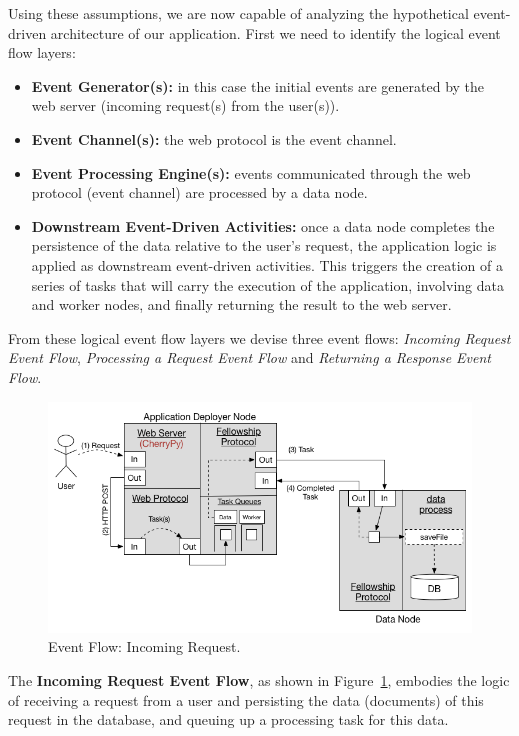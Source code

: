 \documentclass[12pt, titlepage]{uo_temp}
\begin{document}
     Using these assumptions, we are now capable of analyzing the hypothetical event-driven
     architecture of our application. 
     First we need to identify the logical event flow layers:
     \begin{itemize}
     \item \textbf{Event Generator(s):} in this case the initial events are generated by
       the web server (incoming request(s) from the user(s)).
     \item \textbf{Event Channel(s):} the web protocol is the event channel.
     \item \textbf{Event Processing Engine(s):} events communicated through the web
       protocol (event channel) are processed by a data node.
     \item \textbf{Downstream Event-Driven Activities:} once a data node completes the
       persistence of the data relative to the user's request, the application logic is
       applied as downstream event-driven activities. This triggers the creation of
       a series of tasks that will carry the execution of the application, involving data
       and worker nodes, and finally returning the result to the web server.
     \end{itemize}
     From these logical event flow layers we devise three event flows: \emph{Incoming
       Request Event Flow}, \emph{Processing a Request Event Flow} and \emph{Returning a
       Response Event Flow}.
     
     \begin{figure}[h!]
       \centering
       \includegraphics[width=125mm]{images/ef1.png}
       \caption{Event Flow: Incoming Request.}
       \label{ef1}
     \end{figure}

     The \textbf{Incoming Request Event Flow}, as shown in Figure~\ref{ef1}, embodies the
     logic of receiving a request from a user and persisting the data (documents) of this
     request in the database, and queuing up a processing task for this data.
\end{document}

